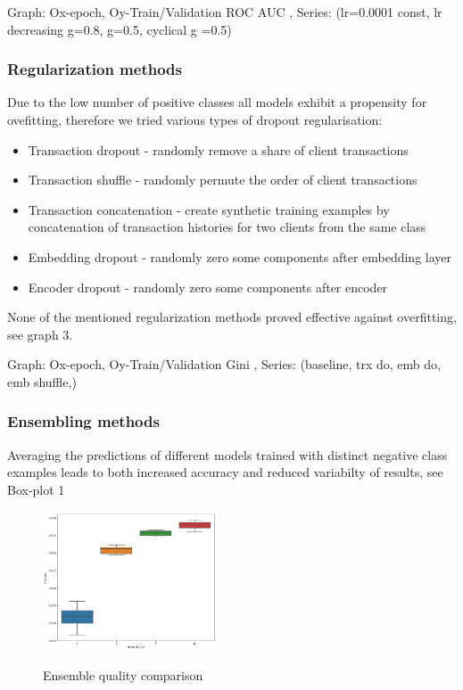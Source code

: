 \documentclass{sigkddExp}
\begin{document}
Graph: Ox-epoch, Oy-Train/Validation ROC AUC , Series: (lr=0.0001 const, lr decreasing g=0.8, g=0.5, cyclical g =0.5) 

\subsubsection{Regularization methods}

Due to the low number of positive classes all models exhibit a propensity for ovefitting, therefore we tried various types of dropout regularisation:
\begin{itemize}
\item Transaction dropout - randomly remove a share of client transactions
\item Transaction shuffle - randomly permute the order of client transactions
\item Transaction concatenation - create synthetic training examples by concatenation of transaction histories for two clients from the same class
\item Embedding dropout - randomly zero some components after embedding layer
\item Encoder dropout - randomly zero some components after encoder
\end{itemize}
None of the mentioned regularization methods proved effective against overfitting, see graph 3.

Graph: Ox-epoch, Oy-Train/Validation Gini , Series: (baseline, trx do, emb do, emb shuffle,)

\subsubsection{Ensembling methods}

Averaging the predictions of different models trained with distinct negative class examples leads to both increased accuracy and reduced variabilty of results, see Box-plot 1

\begin{figure}[h]
  \caption{Ensemble quality comparison}
  \includegraphics[width=0.46\textwidth]{ensemble-pic.png}
  \label{fig-arch}
\end{figure}
\end{document}
